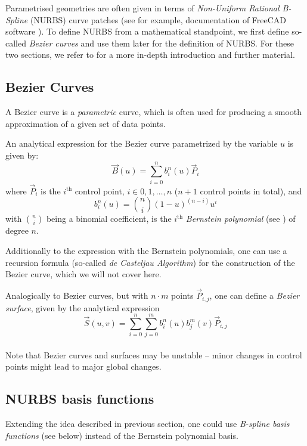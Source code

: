 Parametrised geometries are often given in terms of \emph{Non-Uniform Rational B-Spline} (NURBS) curve patches (see for example, documentation of FreeCAD software \cite{FreeCAD}). 
To define NURBS from a mathematical standpoint, we first define so-called \emph{Bezier curves} and use them later for the definition of NURBS. For these two sections, we refer to \cite{farin2002handbook} for a more in-depth introduction and further material. 
\subsection{Bezier Curves}
A Bezier curve is a \textit{parametric} curve, which is often used for producing a smooth approximation of a given set of data points.
 
An analytical expression for the Bezier curve parametrized by the variable $u$ is given by:
\begin{equation*}
\vec{B}(u)=\sum\limits_{i=0}^n b_i^n(u) \vec{P}_i
\end{equation*}
where $\vec{P}_i$ is the $i^{\text{th}}$ control point, $i\in0,1, \dots ,n$ ($n+1$ control points in total), and
\begin{equation*}
b_i^n(u)=\binom{n}{i}(1-u)^{(n-i)}u^i
\end{equation*}
with $\binom{n}{i}$ being a binomial coefficient, is the $i^{\text{th}}$ \emph{Bernstein polynomial} (see \cite{lorentz2012bernstein}) of degree $n$.

Additionally to the expression with the Bernstein polynomials, one can use a recursion formula (so-called \emph{de Casteljau Algorithm}) for the construction of the Bezier curve, which we will not cover here.

Analogically to Bezier curves, but with $n\cdot m$ points $\vec{P}_{i,j}$,
one can define a \textit{Bezier surface}, given by the analytical expression
\begin{equation*}
\vec{S}(u,v)=\sum\limits_{i=0}^n \sum\limits_{j=0}^m b_i^n(u) b_j^m(v) \vec{P}_{i,j}
\end{equation*}
\\
Note that Bezier curves and surfaces may be unstable -- minor changes in control points might lead to major global changes.


\subsection{NURBS basis functions}
Extending the idea described in previous section, one could use \emph{B-spline basis functions} (see below) instead of the Bernstein polynomial basis.

